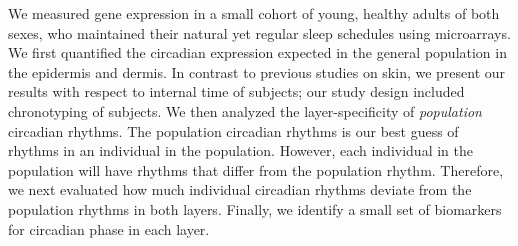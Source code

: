 We measured gene expression in a small cohort of young, healthy adults of both sexes, who maintained their natural yet regular sleep schedules using microarrays. We first quantified the circadian expression expected in the general population in the epidermis and dermis. In contrast to previous studies on skin, we present our results with respect to internal time of subjects; our study design included chronotyping of subjects. We then analyzed the layer-specificity of \textit{population} circadian rhythms. The population circadian rhythms is our best guess of rhythms in an individual in the population. However, each individual in the population will have rhythms that differ from the population rhythm. Therefore, we next evaluated how much individual circadian rhythms deviate from the population rhythms in both layers. Finally, we identify a small set of biomarkers for circadian phase in each layer.



